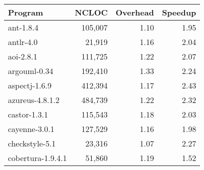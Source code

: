 \begin{tabular}{|l|r|r|r|}
  \hline
  \textbf{Program} & \textbf{NCLOC} & \textbf{Overhead} & \textbf{Speedup} \\
  \hline
  ant-1.8.4 & 105,007 & 1.10 & 1.95 \\
  \hline
  antlr-4.0 & 21,919 & 1.16 & 2.04 \\
  \hline
  aoi-2.8.1 & 111,725 & 1.22 & 2.07 \\
  \hline
  argouml-0.34 & 192,410 & 1.33 & 2.24 \\
  \hline
  aspectj-1.6.9 & 412,394 & 1.17 & 2.43 \\
  \hline
  azureus-4.8.1.2 & 484,739 & 1.22 & 2.32 \\
  \hline
  castor-1.3.1 & 115,543 & 1.18 & 2.03 \\
  \hline
  cayenne-3.0.1 & 127,529 & 1.16 & 1.98 \\
  \hline
  checkstyle-5.1 & 23,316 & 1.07 & 2.27 \\
  \hline
  cobertura-1.9.4.1 & 51,860 & 1.19 & 1.52 \\
  \hline
\end{tabular}

